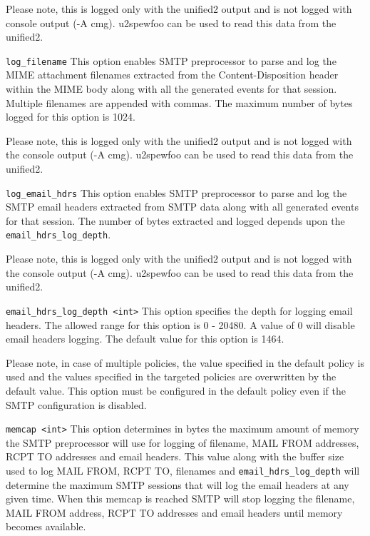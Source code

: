\documentclass[english]{report}
\newcounter{slistnum}
\newenvironment{slist}
{ \begin{list}{ {\bf \arabic{slistnum}.} }{\usecounter{slistnum} } }
{ \end{list} }
\begin{document}
\begin{slist}
Please note, this is logged only with the unified2 output and is not logged with console output (-A cmg).
 u2spewfoo can be used to read this data from the unified2.

\item \texttt{log\_filename}
This option enables SMTP preprocessor to parse and log the MIME attachment filenames extracted 
from the Content-Disposition header within the MIME body along with all the generated events 
for that session. Multiple filenames are appended with commas. The maximum number of bytes logged 
for this option is 1024.

Please note, this is logged only with the unified2 output and is not logged with the 
console output (-A cmg). u2spewfoo can be used to read this data from the unified2.

\item \texttt{log\_email\_hdrs}
This option enables SMTP preprocessor to parse and log the SMTP email headers extracted from 
SMTP data along with all generated events for that session. The number of bytes extracted and 
logged depends upon the \texttt{email\_hdrs\_log\_depth}.

Please note, this is logged only with the unified2 output and is not logged with the console output (-A cmg). 
u2spewfoo can be used to read this data from the unified2.

\item \texttt{email\_hdrs\_log\_depth <int>} 
This option specifies the depth for logging email headers. The allowed range for this option is 
0 - 20480. A value of 0 will disable email headers logging. The default value for this option is 1464. 

Please note, in case of multiple policies, the value specified in the default policy is used and the values 
specified in the targeted policies are overwritten by the default value. 
This option must be configured in the default policy even if the SMTP configuration is disabled.

\item \texttt{memcap <int>}
This option determines in bytes the maximum amount of memory the SMTP preprocessor will
use for logging of filename, MAIL FROM addresses, RCPT TO addresses and email headers. This value
along with the buffer size used to log MAIL FROM, RCPT TO, filenames and \texttt{email\_hdrs\_log\_depth} 
will determine the maximum SMTP sessions that will log the email headers at any given time. When this memcap 
is reached SMTP will stop logging the filename, MAIL FROM address, RCPT TO addresses and email headers
until memory becomes available.


\end{slist}
\end{document}
